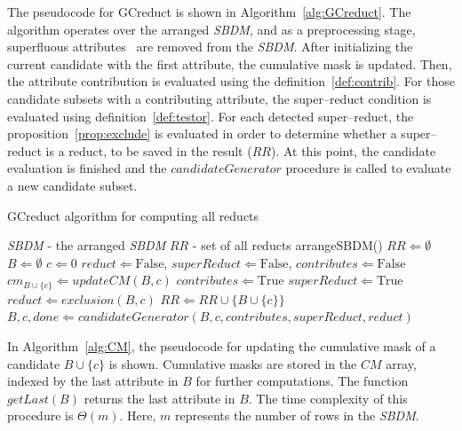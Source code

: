 \documentclass[number,preprint,review,12pt]{elsarticle}
\begin{document}
	\label{superfluous}
	The pseudocode for GCreduct is shown in Algorithm~\ref{alg:GCreduct}. The algorithm operates over the arranged \textit{SBDM}, and as a preprocessing stage, superfluous attributes~\cite{Lazo-Cortes2013} are removed from the \textit{SBDM}. After initializing the current candidate with the first attribute, the cumulative mask is updated. Then, the attribute contribution is evaluated using the definition~\ref{def:contrib}. For those candidate subsets with a contributing attribute, the super--reduct condition is evaluated using definition~\ref{def:testor}. For each detected super--reduct, the proposition~\ref{prop:exclude} is evaluated in order to determine whether a super--reduct is a reduct, to be saved in the result ($RR$). At this point, the candidate evaluation is finished and the $candidateGenerator$ procedure is called to evaluate a new candidate subset.
	
	\begin{algorithm}
	\footnotesize
	\caption{GCreduct algorithm for computing all reducts}
	\label{alg:GCreduct}
	\begin{algorithmic}[1]
		\Require \textit{SBDM} - the arranged \textit{SBDM}
		\Ensure $RR$ - set of all reducts
		\State arrangeSBDM()
		\State $RR \Leftarrow \emptyset$
		\State $B \Leftarrow \emptyset$  
		\State $c \Leftarrow 0$ 
			\State $reduct \Leftarrow \mathrm{False}$, $superReduct \Leftarrow \mathrm{False}$, $contributes \Leftarrow \mathrm{False}$
		  	\State $cm_{B\cup \lbrace c\rbrace} \Leftarrow updateCM(B,c)$
		  	\label{line:contrib}
		  		\State $contributes \Leftarrow \mathrm{True}$
		  		\label{line:superReduct}
		  			\State $superReduct \Leftarrow \mathrm{True}$
		  			\State $reduct \Leftarrow exclusion(B,c)$
		  				\State $RR \Leftarrow RR \cup \lbrace B\cup \lbrace c\rbrace \rbrace$
		  			\EndIf
		  		\EndIf
		  	\EndIf
			\State $B,c,done \Leftarrow candidateGenerator(B,c,contributes,superReduct,reduct)$
	\EndWhile 
		\end{algorithmic}
	\end{algorithm}
	
	In Algorithm~\ref{alg:CM}, the pseudocode for updating the cumulative mask of a candidate $B\cup\lbrace c\rbrace$ is shown. Cumulative masks are stored in the $CM$ array, indexed by the last attribute in $B$ for further computations. The function $getLast(B)$ returns the last attribute in $B$. The time complexity of this procedure is $\Theta(m)$. Here, $m$ represents the number of rows in the \textit{SBDM}.
		
\end{document}
